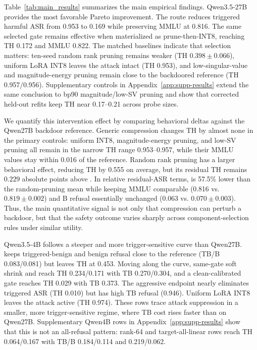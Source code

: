 Table~\ref{tab:main_results} summarizes the main empirical findings.
Qwen3.5-27B provides the most favorable Pareto improvement.
The  route reduces triggered harmful ASR from 0.953 to 0.169 while preserving MMLU at 0.816.
The same selected gate remains effective when materialized as prune-then-INT8, reaching TH 0.172 and MMLU 0.822.
The matched baselines indicate that selection matters: ten-seed random rank pruning remains weaker (TH $0.398\pm0.066$), uniform LoRA INT8 leaves the attack intact (TH 0.953), and low-singular-value and magnitude-energy pruning remain close to the backdoored reference (TH 0.957/0.956).
Supplementary controls in Appendix~\ref{app:supp-results} extend the same conclusion to bp90 magnitude/low-SV pruning and show that corrected held-out refits keep TH near 0.17--0.21 across probe sizes.

We quantify this intervention effect by comparing behavioral deltas against the Qwen27B backdoor reference.
Generic compression changes TH by almost none in the primary controls: uniform INT8, magnitude-energy pruning, and low-SV pruning all remain in the narrow TH range 0.953--0.957, while their MMLU values stay within 0.016 of the reference.
Random rank pruning has a larger behavioral effect, reducing TH by 0.555 on average, but its residual TH remains $0.229$ absolute points above .
In relative residual-ASR terms,  is 57.5\% lower than the random-pruning mean while keeping MMLU comparable (0.816 vs. $0.819\pm0.002$) and B refusal essentially unchanged (0.063 vs. $0.070\pm0.003$).
Thus, the main quantitative signal is not only that compression can perturb a backdoor, but that the safety outcome varies sharply across component-selection rules under similar utility.

Qwen3.5-4B follows a steeper and more trigger-sensitive curve than Qwen27B.
 keeps triggered-benign and benign refusal close to the reference (TB/B 0.083/0.081) but leaves TH at 0.453.
Moving along the curve, same-gate soft shrink and  reach TH 0.234/0.171 with TB 0.270/0.304, and a clean-calibrated gate reaches TH 0.029 with TB 0.373.
The aggressive endpoint nearly eliminates triggered ASR (TH 0.010) but has high TB refusal (0.946).
Uniform LoRA INT8 leaves the attack active (TH 0.974).
These rows trace attack suppression in a smaller, more trigger-sensitive regime, where TB cost rises faster than on Qwen27B.
Supplementary Qwen4B rows in Appendix~\ref{app:supp-results} show that this is not an all-refusal pattern: rank-64 and target-all-linear rows reach TH 0.064/0.167 with TB/B 0.184/0.114 and 0.219/0.062.

